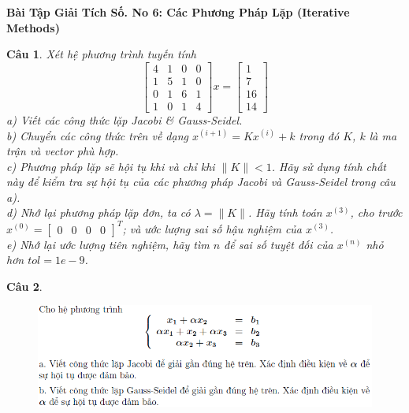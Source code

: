 \documentclass[11pt]{article}
\newtheorem{bt}{Câu}
\newcommand{\m}[1]{
	\begin{bmatrix}
		#1
	\end{bmatrix}
}
\begin{document}



\begin{center}
	{\bf Bài Tập Giải Tích Số. No 6: Các Phương Pháp Lặp (Iterative Methods)}
\end{center}

\begin{bt}
Xét hệ phương trình tuyến tính
%
\begin{equation}
 \m{4 & 1 & 0 & 0 \\ 1 & 5 & 1 & 0 \\ 0 & 1 & 6 & 1 \\ 1 & 0 & 1 & 4} x = \m{1 \\ 7 \\ 16 \\ 14}
\end{equation}
%
a) Viết các công thức lặp Jacobi \& Gauss-Seidel. \\
b) Chuyển các công thức trên về dạng $x^{(i+1)} = K x^{(i)} + k$ trong đó $K$, $k$ là ma trận và vector phù hợp. \\ 
c) Phương pháp lặp sẽ hội tụ khi và chỉ khi $\|K\|<1$. Hãy sử dụng tính chất này để kiểm tra sự hội tụ của các phương pháp Jacobi và Gauss-Seidel trong câu a). \\
d) Nhớ lại phương pháp lặp đơn, ta có $\lambda = \|K\|$. Hãy tính toán $x^{(3)}$, cho trước \linebreak 
$x^{(0)}=\m{0 & 0 & 0 & 0}^T$; và ước lượng sai số hậu nghiệm của $x^{(3)}$. \\
e) Nhớ lại ước lượng tiên nghiệm, hãy tìm $n$ để sai số tuyệt đối của $x^{(n)}$ nhỏ hơn $tol=1e-9$.
\end{bt}

\begin{bt}
\end{bt}
\begin{figure}[!h]
	\includegraphics[scale = 0.7]{Figures/5}
\end{figure}


\newpage
\end{document}
